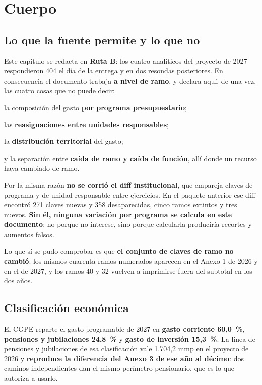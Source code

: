 \section{Cuerpo}



\subsection*{Lo que la fuente permite y lo que no}

Este capítulo se redacta en \textbf{Ruta B}: los cuatro analíticos del proyecto de 2027
respondieron 404 el día de la entrega y en dos resondas posteriores. En consecuencia el
documento trabaja \textbf{a nivel de ramo}, y declara aquí, de una vez, las cuatro cosas que
no puede decir:

\begin{list}{}{\setlength{\leftmargin}{1.4em}\setlength{\itemsep}{2pt}}
\item[$\bullet$] la composición del gasto \textbf{por programa presupuestario};
\item[$\bullet$] las \textbf{reasignaciones entre unidades responsables};
\item[$\bullet$] la \textbf{distribución territorial} del gasto;
\item[$\bullet$] y la separación entre \textbf{caída de ramo y caída de función}, allí donde
un recurso haya cambiado de ramo.
\end{list}

Por la misma razón \textbf{no se corrió el diff institucional}, que empareja claves de
programa y de unidad responsable entre ejercicios. En el paquete anterior ese diff encontró
271 claves nuevas y 358 desaparecidas, cinco ramos extintos y tres nuevos. \textbf{Sin él,
ninguna variación por programa se calcula en este documento}: no porque no interese, sino
porque calcularla produciría recortes y aumentos falsos.

Lo que sí se pudo comprobar es que \textbf{el conjunto de claves de ramo no cambió}: los
mismos cuarenta ramos numerados aparecen en el Anexo 1 de 2026 y en el de 2027, y los ramos
40 y 32 vuelven a imprimirse fuera del subtotal en los dos años.

\subsection*{Clasificación económica}

El CGPE reparte el gasto programable de 2027 en \textbf{gasto corriente 60,0~\%},
\textbf{pensiones y jubilaciones 24,8~\%} y \textbf{gasto de inversión 15,3~\%}. La línea
de pensiones y jubilaciones de esa clasificación vale 1.704,2 mmp en el proyecto de 2026 y
\textbf{reproduce la diferencia del Anexo 3 de ese año al décimo}: dos caminos
independientes dan el mismo perímetro pensionario, que es lo que autoriza a usarlo.

